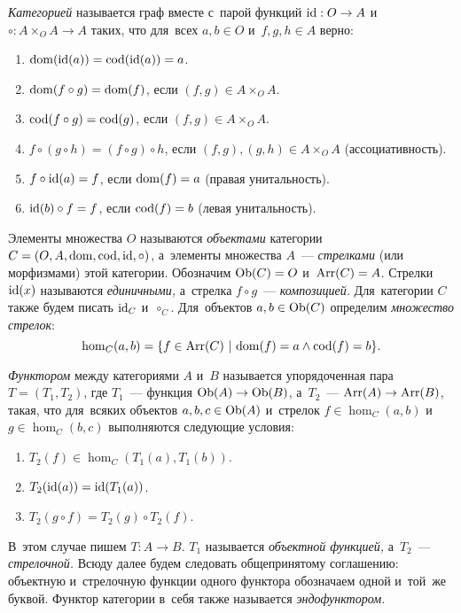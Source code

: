 \documentclass{article}
\begin{document}
\textit{Категорией} называется граф вместе с~парой функций $\mathrm{id} : O \rightarrow A$
и~$\circ : A \times_O A \rightarrow A$ таких, что для~всех $a, b \in O$ и~$f, g, h \in A$ верно:
\begin{enumerate}
    \item $\mathrm{dom}(\mathrm{id}(a)) = \mathrm{cod}(\mathrm{id}(a)) = a$.
    \item $\mathrm{dom}(f \circ g) = \mathrm{dom}(f)$, если $(f, g) \in A \times_O A$.
    \item $\mathrm{cod}(f \circ g) = \mathrm{cod}(g)$, если $(f, g) \in A \times_O A$.
    \item $f \circ (g \circ h) = (f \circ g) \circ h$, если $(f, g), (g, h) \in A \times_O A$ (ассоциативность).
    \item $f \circ \mathrm{id}(a) = f$, если $\mathrm{dom}(f) = a$ (правая унитальность).
    \item $\mathrm{id}(b) \circ f = f$, если $\mathrm{cod}(f) = b$ (левая унитальность).
\end{enumerate}

Элементы множества $O$ называются \textit{объектами} категории $C = (O, A, \mathrm{dom}, \mathrm{cod}, \mathrm{id}, \circ)$,
а~элементы множества $A$~— \textit{стрелками} (или морфизмами) этой категории. Обозначим $\mathrm{Ob}(C) = O$ и~$\mathrm{Arr}(C) = A$.
Стрелки $\mathrm{id}(x)$ называются \textit{единичными,} а~стрелка $f \circ g$~— \textit{композицией.} Для~категории $C$ также будем писать $\mathrm{id}_C$ и~$\circ_C$.
Для~объектов $a, b \in \mathrm{Ob}(C)$ определим \textit{множество стрелок}:
$$
    \hom_C(a, b) = \{ f \in \mathrm{Arr}(C)\ | \ \mathrm{dom}(f) = a \wedge \mathrm{cod}(f) = b \}.
$$

\textit{Функтором} между категориями $A$ и~$B$ называется упорядоченная пара $T = (T_1, T_2)$,
где $T_1$~— функция $\mathrm{Ob}(A) \rightarrow \mathrm{Ob}(B)$, а~$T_2$~— $\mathrm{Arr}(A) \rightarrow \mathrm{Arr}(B)$,
такая, что для~всяких объектов $a, b, c \in \mathrm{Ob}(A)$ и~стрелок $f \in \hom_C(a, b)$ и~$g \in \hom_C(b, c)$ выполняются
следующие условия:
\begin{enumerate}
    \item $T_2(f) \in \hom_C(T_1(a), T_1(b))$.
    \item $T_2(\mathrm{id}(a)) = \mathrm{id}(T_1(a))$.
    \item $T_2(g \circ f) = T_2(g) \circ T_2(f)$.
\end{enumerate}

В~этом случае пишем $T : A \rightarrow B$. $T_1$ называется \textit{объектной функцией,} а~$T_2$~— \textit{стрелочной.}
Всюду далее будем следовать общепринятому соглашению: объектную и~стрелочную функции одного функтора обозначаем одной и~той~же буквой.
Функтор категории в~себя также называется \textit{эндофунктором.}
\end{document}
